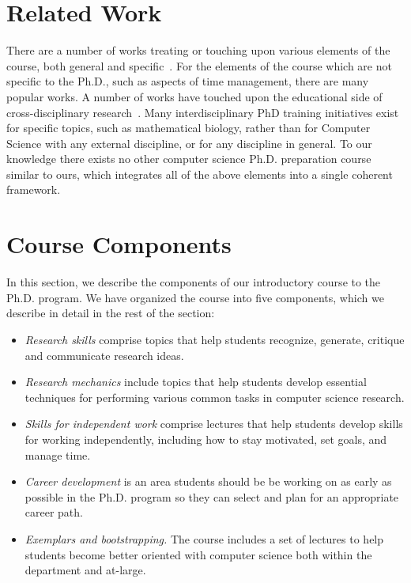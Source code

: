 \section{Related Work}\label{sec:related}

There are a number of works treating or touching upon various elements
of the course, both general and
specific~\cite{phd-not-enough,reshaping-grad-educ,grad-school-survival,
  unwritten-rules,art-sci-investigation,creativity-in-science,res-students-guide}.
For the elements of the course which are not specific to the Ph.D., such
as aspects of time management, there are many popular works.  A number
of works have touched upon the educational side of cross-disciplinary
research~\cite{work-at-boundaries,facilitating-interdisc,
  grand-unif-interdisc,discourse-anal-cross-disc}.  Many
interdisciplinary PhD training initiatives exist for specific topics,
such as mathematical biology, rather than for Computer Science with any
external discipline, or for any discipline in general.  To our knowledge
there exists no other computer science Ph.D. preparation course similar
to ours, which integrates all of the above elements into a single
coherent framework.

\section{Course Components}\label{sec:components}

In this section, we describe the components of our introductory course
to the Ph.D. program.  We have organized the course into five
components, which we describe in detail in the rest of the section:

\begin{itemize}
\itemsep=-1pt
\item {\em Research skills} comprise topics that help students
  recognize, generate, critique and communicate research ideas.
\item {\em Research mechanics} include topics that help students develop
  essential techniques for performing various common tasks in computer
  science research.
\item {\em Skills for independent work} comprise lectures that help
  students develop skills for working independently, including how to stay
  motivated, set goals, and manage time.
\item {\em Career development} is an area students should be be working
  on as early as possible in the Ph.D. program so they can select and
  plan for an appropriate career path.
\item {\em Exemplars and bootstrapping.} The course includes a set of
  lectures to help students become better oriented with computer science
  both within the department and at-large.
\end{itemize}

